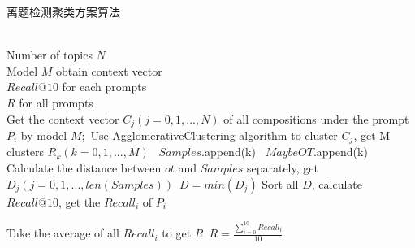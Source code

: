 \documentclass[UTF8]{ctexart}
\begin{document}
\begin{algorithm}[h]
    \caption{离题检测聚类方案算法}
    \label{}
    \begin{algorithmic}[1]
      \REQUIRE ~~\\ %
        Number of topics $N$\\
        Model $M$ obtain context vector
      \ENSURE ~~\\ %
        $Recall@10$ for each prompts \\ 
        $R$ for all prompts \\
            \STATE Get the context vector $C_j(j=0,1,...,N)$ of all compositions under the prompt $P_i$ by model $M$;\
            \STATE Use AgglomerativeClustering algorithm to cluster $C_j$, get M clusters $R_k(k=0,1,...,M)$\
              \IF{$Num(k)$ \textgreater 5}
                \STATE $Samples$.append(k)\   %
              \ELSE
                \STATE $MaybeOT$.append(k)\   %
              \ENDIF
            \ENDFOR
              \STATE Calculate the distance between $ot$ and $Samples$ separately, get $D_j(j=0,1,...,len(Samples))$\
              \STATE $D = min(D_j)$   %
            \ENDFOR
            \STATE Sort all $D$, calculate $Recall@10$, get the $Recall_i$ of $P_i$\
        \ENDFOR

        \STATE Take the average of all $Recall_i$ to get $R$\
        \STATE $R=\frac{\sum_{i=0}^{10} Recall_i}{10}$\
    \end{algorithmic}
\end{algorithm}
\end{document}
